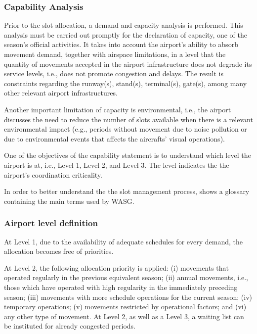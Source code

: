 \subsubsection{Capability Analysis}

Prior to the slot allocation, a demand and capacity analysis is performed. This analysis must be carried out promptly for the declaration of capacity, one of the season's official activities. It takes into account the airport's ability to absorb movement demand, together with airspace limitations, in a level that the quantity of movements accepted in the airport infrastructure does not degrade its service levels, i.e.,  does not promote congestion and delays. The result is constraints regarding the runway(s), stand(s), terminal(s), gate(s), among many other relevant airport infrastructures.

Another important limitation of capacity is environmental, i.e., the airport discusses the need to reduce the number of slots available when there is a relevant environmental impact (e.g., periods without movement due to noise pollution or due to environmental events that affects the aircrafts’ visual operations). 

One of the objectives of the capability statement is to understand which level the airport is at, i.e., Level 1, Level 2, and Level 3. The level indicates the the airport's coordination criticality. 

In order to better understand the the slot management process,  shows a glossary containing the main terms used by \acrshort{WASG}.



\subsubsection{Airport level definition}

At Level 1, due to the availability of adequate schedules for every demand, the allocation becomes free of priorities.

At Level 2, the following allocation priority is applied: (i) movements that operated regularly in the previous equivalent season; (ii) annual movements, i.e., those which have operated with high regularity in the immediately preceding season; (iii) movements with more schedule operations for the current season; (iv) temporary operations; (v) movements restricted by operational factors; and (vi) any other type of movement. At Level 2, as well as a Level 3, a waiting list can be instituted for already congested periods.

